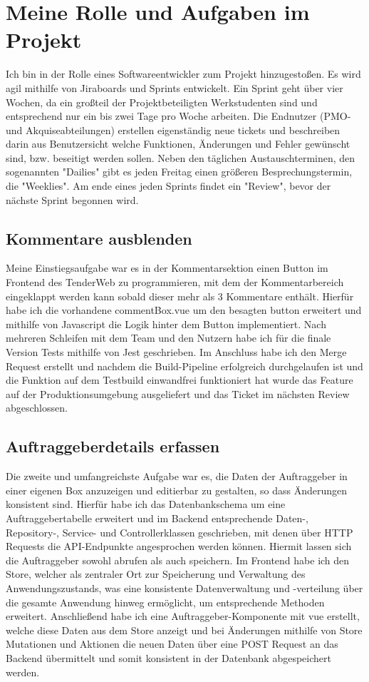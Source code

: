 \section{Meine Rolle und Aufgaben im Projekt}
Ich bin in der Rolle eines Softwareentwickler zum Projekt hinzugestoßen. Es wird agil mithilfe von Jiraboards und
Sprints entwickelt. Ein Sprint geht über vier Wochen, da ein großteil der Projektbeteiligten Werkstudenten sind und
entsprechend nur ein bis zwei Tage pro Woche arbeiten. Die Endnutzer (PMO- und Akquiseabteilungen) erstellen
eigenständig neue tickets und beschreiben darin aus Benutzersicht welche Funktionen, Änderungen und Fehler gewünscht
sind, bzw. beseitigt werden sollen. Neben den täglichen Austauschterminen, den sogenannten "Dailies" gibt es jeden
Freitag einen größeren Besprechungstermin, die "Weeklies". Am ende eines jeden Sprints findet ein "Review", bevor der
nächste Sprint begonnen wird.

\subsection{Kommentare ausblenden}
Meine Einstiegsaufgabe war es in der Kommentarsektion einen Button im Frontend des TenderWeb zu programmieren, mit dem
der Kommentarbereich eingeklappt werden kann sobald dieser mehr als 3 Kommentare enthält. Hierfür habe ich die
vorhandene commentBox.vue um den besagten button erweitert und mithilfe von Javascript die Logik hinter dem Button
implementiert. Nach mehreren Schleifen mit dem Team und den Nutzern habe ich für die finale Version Tests mithilfe von
Jest geschrieben. Im Anschluss habe ich den Merge Request erstellt und nachdem die Build-Pipeline erfolgreich
durchgelaufen ist und die Funktion auf dem Testbuild einwandfrei funktioniert hat wurde das Feature auf der
Produktionsumgebung ausgeliefert und das Ticket im nächsten Review abgeschlossen.

\subsection{Auftraggeberdetails erfassen}
Die zweite und umfangreichste Aufgabe war es, die Daten der Auftraggeber in einer eigenen Box anzuzeigen und editierbar
zu gestalten, so dass Änderungen konsistent sind. Hierfür habe ich das Datenbankschema um eine Auftraggebertabelle erweitert
und im Backend entsprechende Daten-, Repository-, Service- und Controllerklassen geschrieben, mit denen über HTTP
Requests die API-Endpunkte angesprochen werden können. Hiermit lassen sich die Auftraggeber sowohl abrufen als auch speichern. Im
Frontend habe ich den Store, welcher als zentraler Ort zur Speicherung und Verwaltung des Anwendungszustands, was eine
konsistente Datenverwaltung und -verteilung über die gesamte Anwendung hinweg ermöglicht, um entsprechende Methoden
erweitert. Anschließend habe ich eine Auftraggeber-Komponente mit vue erstellt, welche diese Daten aus dem Store anzeigt und bei
Änderungen mithilfe von Store Mutationen und Aktionen die neuen Daten über eine POST Request an das Backend übermittelt
und somit konsistent in der Datenbank abgespeichert werden. 


